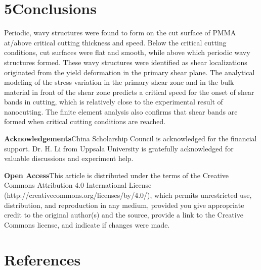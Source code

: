 \documentclass{article}
\begin{document}
\section*{5\quad Conclusions}

Periodic, wavy structures were found to form on the cut surface of PMMA at/above critical cutting thickness and speed. Below the critical cutting conditions, cut surfaces were flat and smooth, while above which periodic wavy structures formed. These wavy structures were identified as shear localizations originated from the yield deformation in the primary shear plane. The analytical modeling of the stress variation in the primary shear zone and in the bulk material in front of the shear zone predicts a critical speed for the onset of shear bands in cutting, which is relatively close to the experimental result of nanocutting. The finite element analysis also confirms that shear bands are formed when critical cutting conditions are reached.

\noindent\textbf{Acknowledgements}\quad China Scholarship Council is acknowledged for the financial support. Dr. H. Li from Uppsala University is gratefully acknowledged for valuable discussions and experiment help.

\noindent\textbf{Open Access}\quad This article is distributed under the terms of the Creative Commons Attribution 4.0 International License (http://creativecommons.org/licenses/by/4.0/), which permits unrestricted use, distribution, and reproduction in any medium, provided you give appropriate credit to the original author(s) and the source, provide a link to the Creative Commons license, and indicate if changes were made.

\section*{References}
\end{document}
